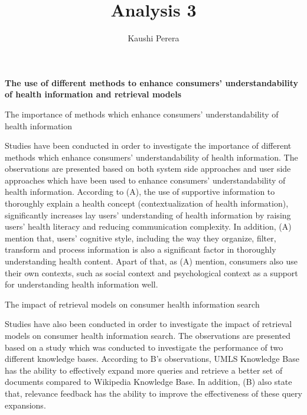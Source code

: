 \documentclass[]{article}
\title{Analysis 3}
\author{Kaushi Perera}
\begin{document}
	
\maketitle
	
\textbf{The use of different methods to enhance consumers' understandability of health information and retrieval models}


The importance of methods which enhance consumers' understandability of health information 


Studies have been conducted in order to investigate the importance of different methods which enhance consumers' understandability of health information. The observations are presented based on both system side approaches and user side approaches which have been used to enhance consumers' understandability of health information. According to (A), the use of supportive information to thoroughly explain a health concept (contextualization of health information), significantly increases lay users' understanding of health information by raising users' health literacy and reducing communication complexity. In addition, (A) mention that, users' cognitive style, including the way they organize, filter, transform and process information is also a significant factor in thoroughly understanding health content. Apart of that, as (A) mention, consumers also use their own contexts, such as social context and psychological context as a support for understanding health information well.        


The impact of retrieval models on consumer health information search 


Studies have also been conducted in order to investigate the impact of retrieval models on consumer health information search. The observations are presented based on a study which was conducted to investigate the performance of two different knowledge bases. According to B's observations, UMLS Knowledge Base has the ability to effectively expand more queries and retrieve a better set of documents compared to Wikipedia Knowledge Base. In addition, (B) also state that, relevance feedback has the ability to improve the effectiveness of these query expansions.        

   
\end{document}
